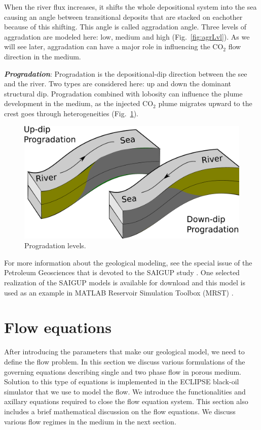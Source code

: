 When the river flux increases, it shifts the whole depositional system into the
sea causing an  angle between transitional deposits that are stacked on
eachother because of this shifting. This angle is called aggradation angle.
Three levels of aggradation are modeled here: low, medium and
high (Fig.~\ref{fig:agrLvl}). As we will see later, aggradation can have a major
role in influencing the $\mbox{CO}_2$ flow direction in the medium. 

\textbf{\textit{Progradation}}: 
Progradation is the depositional-dip direction between the see and the river.
Two types are considered here: up and down the dominant structural dip.
Progradation combined with lobosity can influence the plume development in the
medium, as the injected $\mbox{CO}_2$ plume migrates upward to the crest goes
through heterogeneities (Fig.~\ref{fig:proLvl}).


\begin{figure}[thb]
  \centering
  \includegraphics[width=0.65 \linewidth]{./figurer/progradation} 
  \caption{Progradation levels.}
  \label{fig:proLvl}
%
\end{figure}

\vspace{1cm}
For more information about the geological modeling, see the special issue of the Petroleum Geosciences that is devoted to the SAIGUP study \cite{matthews2008assessing}. One selected realization of the SAIGUP models is available for download \cite{saigupModel} and this model is used as an example in MATLAB Reservoir Simulation Toolbox (MRST) \cite{mrstSaigup}. 

\section{Flow equations}
\label{sec:FlowEquations}
After introducing the parameters that make our geological model, we need to
define the flow problem. In this section we discuss various formulations of the governing equations describing single and two phase flow in porous medium. Solution to this type of equations is implemented in the ECLIPSE black-oil simulator that we use to model the flow. We introduce the functionalities and axillary equations required to close the flow equation system. This section also includes a brief mathematical discussion on the flow equations. We discuss various flow regimes in the medium in the next section.

